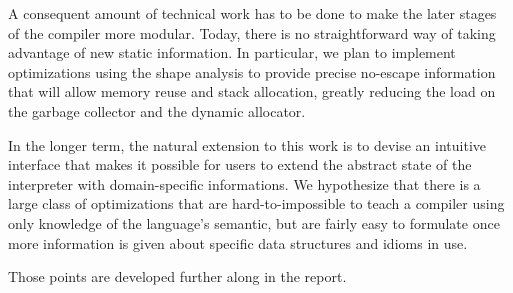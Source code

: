 \documentclass[11pt]{article}
\begin{document}
A consequent amount of technical work has to be done to make the later stages of the compiler more modular.
Today, there is no straightforward way of taking advantage of new static information.
In particular, we plan to implement optimizations using the shape analysis to provide precise no-escape information that will allow memory reuse and stack allocation, greatly reducing the load on the garbage collector and the dynamic allocator.

In the longer term, the natural extension to this work is to devise an intuitive interface that makes it possible for users to extend the abstract state of the interpreter with domain-specific informations. We hypothesize that there is a large class of optimizations that are hard-to-impossible to teach a compiler using only knowledge of the language's semantic, but are fairly easy to formulate once more information is given about specific data structures and idioms in use. 

Those points are developed further along in the report.
\end{document}
